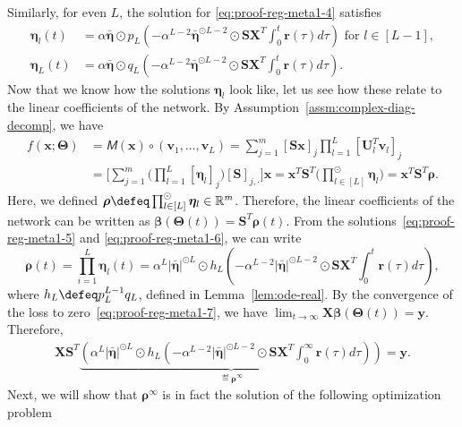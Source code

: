 \documentclass{article} %
\def\vr{{\bm{r}}}
\def\vv{{\bm{v}}}
\def\vx{{\bm{x}}}
\def\vy{{\bm{y}}}
\def\mS{{\bm{S}}}
\def\mU{{\bm{U}}}
\def\mX{{\bm{X}}}
\newcommand{\tens}[1]{\bm{\mathsfit{#1}}}
\def\tM{{\tens{M}}}
\newcommand{\R}{\mathbb{R}}
\newcommand{\vbeta}{{\bm{\beta}}}
\newcommand{\bTheta}{\bm{\Theta}}
\newcommand{\vrho}{{\bm{\rho}}}
\newcommand{\veta}{{\bm{\eta}}}
\begin{document}
Similarly, for even $L$, the solution for \eqref{eq:proof-reg-meta1-4} satisfies
\begin{equation}
\label{eq:proof-reg-meta1-6}
\begin{aligned}
    \veta_l(t) &= \alpha \bar \veta \odot p_L\left (-\alpha^{L-2} \bar \veta^{\odot L-2} \odot \mS \mX^T \int_0^t \vr(\tau)d\tau \right) \text{ for } l \in [L-1],\\
    \veta_L(t) &= \alpha \bar \veta \odot q_L\left (-\alpha^{L-2} \bar \veta^{\odot L-2} \odot \mS \mX^T \int_0^t \vr(\tau)d\tau \right).
\end{aligned}
\end{equation}
Now that we know how the solutions $\veta_l$ look like, let us see how these relate to the linear coefficients of the network. 
By Assumption~\ref{assm:complex-diag-decomp}, we have
\begin{align*}
    f(\vx; \bTheta) 
    &= \tM(\vx) \circ (\vv_1, \dots, \vv_L)
    = \sum_{j=1}^m [\mS \vx]_j \prod_{l=1}^L [\mU_l^T \vv_l]_j\\
    &= \bigg[ \sum_{j=1}^m \bigg(\prod_{l=1}^L [\veta_l]_j \bigg) [\mS]_{j,\cdot} \bigg ]\vx
    = \vx^T \mS^T \bigg(\prod\nolimits_{l \in [L]}^{\odot} \veta_l \bigg)
    = \vx^T \mS^T \vrho.
\end{align*}
Here, we defined $\vrho \defeq \prod\nolimits_{l \in [L]}^{\odot} \veta_l \in \R^m$.
Therefore, the linear coefficients of the network can be written as $\vbeta(\bTheta(t)) = \mS^T \vrho(t)$.
From the solutions~\eqref{eq:proof-reg-meta1-5} and \eqref{eq:proof-reg-meta1-6}, we can write
\begin{equation*}
    \vrho(t) = \prod_{i=1}^L \veta_l(t)
    = \alpha^{L} |\bar \veta|^{\odot L} \odot h_L \left (
    -\alpha^{L-2} |\bar \veta|^{\odot L-2} \odot \mS \mX^T \int_0^t \vr(\tau)d\tau
    \right ),
\end{equation*}
where $h_L \defeq p_L^{L-1} q_L$, defined in Lemma~\ref{lem:ode-real}.
By the convergence of the loss to zero~\eqref{eq:proof-reg-meta1-7}, we have $\lim_{t \to \infty} \mX \vbeta(\bTheta(t)) = \vy$. Therefore,
\begin{align}
\label{eq:proof-reg-meta1-9}
    \mX \mS^T \underbrace{\left ( 
    \alpha^L |\bar \veta|^{\odot L} \odot h_L \left (
    -\alpha^{L-2} |\bar \veta|^{\odot L-2} \odot \mS \mX^T \int_0^\infty \vr(\tau)d\tau
    \right )
    \right )}_{\eqdef \vrho^\infty}
    = \vy.
\end{align}
Next, we will show that $\vrho^\infty$ is in fact the solution of the following optimization problem
\end{document}
